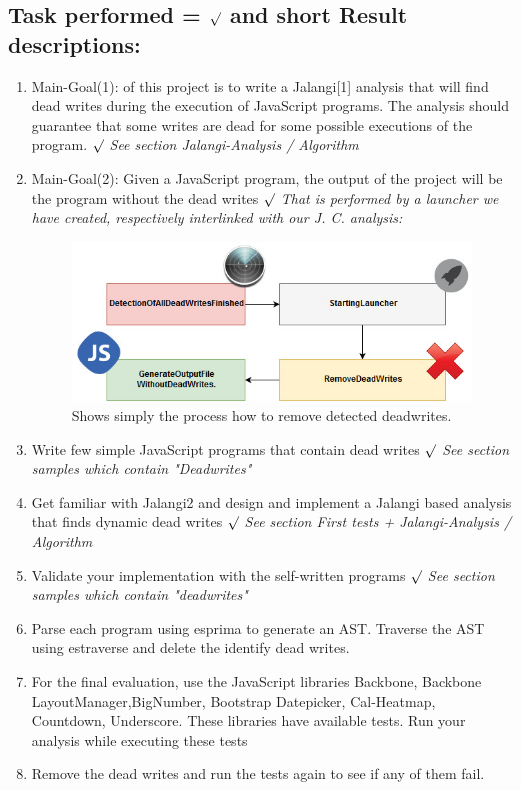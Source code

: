 \documentclass[a4paper]{scrartcl}
\begin{document}
\subsection{Task performed = $\surd$ and short Result descriptions:}
\begin{enumerate}
\item Main-Goal(1): of this project is to write a Jalangi[1] analysis that will find dead writes during the execution of JavaScript programs. The analysis should guarantee that some writes are dead for some possible executions of the program. $\surd$ \newline \textit{See section Jalangi-Analysis / Algorithm}
\item Main-Goal(2): Given a JavaScript program, the output of the project will be the program without the dead writes
 $\surd$ \textit {That is performed by a launcher we have created, respectively interlinked with our J. C. analysis:} \begin{figure}[!htb]
	\centering
	\includegraphics[width=0.6\linewidth]{Launcher.jpg}
	\caption{Shows simply the process  how to remove detected deadwrites.}
	\label{img:grafik-dummy}
\end{figure}
\item Write few simple JavaScript programs that contain dead writes  $\surd$ \newline \textit{See section samples which contain "Deadwrites"}
\item Get familiar with Jalangi2 and design and implement a Jalangi based analysis that finds dynamic dead writes  $\surd$ \textit{See section First tests + Jalangi-Analysis / Algorithm}
\item Validate your implementation with the self-written programs  $\surd$ \newline \textit{See section samples which contain "deadwrites"}
\item Parse each program using esprima to generate an AST. Traverse the AST using estraverse and delete the identify dead writes. 
\item For the final evaluation, use the JavaScript libraries Backbone, Backbone LayoutManager,BigNumber, Bootstrap Datepicker, Cal-Heatmap, Countdown, Underscore. These libraries have available tests. Run your analysis while executing these tests 
\item Remove the dead writes and run the tests again to see if any of them fail.
\end{enumerate}
\newpage
\end{document}

